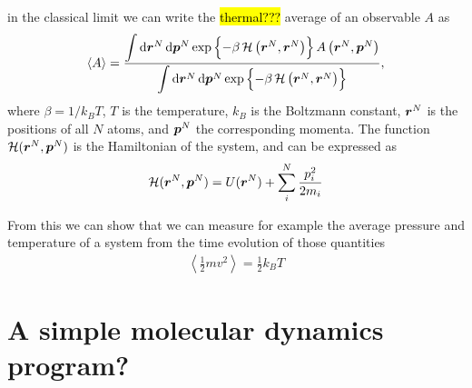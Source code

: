 in the classical limit we can write the \hl{thermal???} average of an observable $A$ as\cite{frenkel2001understanding}
\begin{align*}
    \left\langle A\right\rangle = \frac
    {
        \bigint \dif \bvec r^N \dif \bvec p^N \exp 
        \left\{
            -\beta \Ham \left( \bvec r^N, \bvec r^N \right)
        \right\} 
        A\left(\bvec r^N, \bvec p^N\right)
    }
    {
        \bigint \dif \bvec r^N \dif \bvec p^N \exp 
        \left\{
            -\beta \Ham\left( \bvec r^N, \bvec r^N \right)
        \right\}
    },
\end{align*}
where $\beta = 1/k_B T$, $T$ is the temperature, $k_B$ is the Boltzmann constant, $\boldsymbol{r}^N$ is the positions of all $N$ atoms, and $\boldsymbol{p}^N$ the corresponding momenta. The function $\operatorname{\mathcal{H}}(\boldsymbol{r}^N, \boldsymbol{p}^N)$ is the Hamiltonian of the system, and can be expressed as
\begin{align*}
    \operatorname{\mathcal{H}}(\boldsymbol{r}^N, \boldsymbol{p}^N) = 
        U(\boldsymbol{r}^N) + \sum_i^N \frac{p_i^2}{2m_i}
\end{align*}

From this we can show that we can measure for example the average pressure and temperature of a system from the time evolution of those quantities
\begin{align*}
    \left\langle \frac{1}{2}mv^2 \right\rangle = \frac{1}{2}k_B T
\end{align*}


\chapter{A simple molecular dynamics program?}



